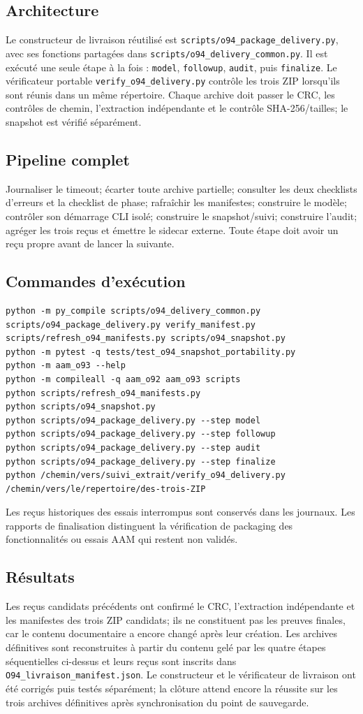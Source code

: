 \documentclass[11pt,a4paper]{article}
\begin{document}
\subsection{Architecture}
Le constructeur de livraison réutilisé est \texttt{scripts/o94\_package\_delivery.py}, avec ses fonctions partagées dans \texttt{scripts/o94\_delivery\_common.py}. Il est exécuté une seule étape à la fois : \texttt{model}, \texttt{followup}, \texttt{audit}, puis \texttt{finalize}. Le vérificateur portable \texttt{verify\_o94\_delivery.py} contrôle les trois ZIP lorsqu'ils sont réunis dans un même répertoire. Chaque archive doit passer le CRC, les contrôles de chemin, l'extraction indépendante et le contrôle SHA-256/tailles; le snapshot est vérifié séparément.
\subsection{Pipeline complet}
Journaliser le timeout; écarter toute archive partielle; consulter les deux checklists d'erreurs et la checklist de phase; rafraîchir les manifestes; construire le modèle; contrôler son démarrage CLI isolé; construire le snapshot/suivi; construire l'audit; agréger les trois reçus et émettre le sidecar externe. Toute étape doit avoir un reçu propre avant de lancer la suivante.
\subsection{Commandes d'exécution}
\begin{verbatim}
python -m py_compile scripts/o94_delivery_common.py scripts/o94_package_delivery.py verify_manifest.py scripts/refresh_o94_manifests.py scripts/o94_snapshot.py
python -m pytest -q tests/test_o94_snapshot_portability.py
python -m aam_o93 --help
python -m compileall -q aam_o92 aam_o93 scripts
python scripts/refresh_o94_manifests.py
python scripts/o94_snapshot.py
python scripts/o94_package_delivery.py --step model
python scripts/o94_package_delivery.py --step followup
python scripts/o94_package_delivery.py --step audit
python scripts/o94_package_delivery.py --step finalize
python /chemin/vers/suivi_extrait/verify_o94_delivery.py /chemin/vers/le/repertoire/des-trois-ZIP
\end{verbatim}
Les reçus historiques des essais interrompus sont conservés dans les journaux. Les rapports de finalisation distinguent la vérification de packaging des fonctionnalités ou essais AAM qui restent non validés.
\subsection{Résultats}
Les reçus candidats précédents ont confirmé le CRC, l'extraction indépendante et les manifestes des trois ZIP candidats; ils ne constituent pas les preuves finales, car le contenu documentaire a encore changé après leur création. Les archives définitives sont reconstruites à partir du contenu gelé par les quatre étapes séquentielles ci-dessus et leurs reçus sont inscrits dans \texttt{O94\_livraison\_manifest.json}. Le constructeur et le vérificateur de livraison ont été corrigés puis testés séparément; la clôture attend encore la réussite sur les trois archives définitives après synchronisation du point de sauvegarde.
\end{document}
